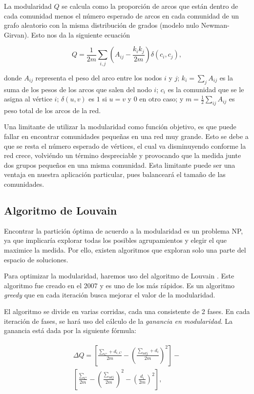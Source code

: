 \documentclass[conference]{IEEEtran}
\begin{document}
La modularidad $Q$ se calcula como la proporción de arcos que están dentro de cada comunidad menos el número esperado de arcos en cada comunidad de un grafo aleatorio con la misma distribución de grados (modelo nulo Newman-Girvan). Esto nos da la siguiente ecuación \cite{blondel_fast_2008}

\[
    Q = \frac{1}{2m} \sum_{i,j} (A_{ij} - \frac{k_i k_j}{2m}) \delta (c_i, c_j),
\]

donde $A_{ij}$ representa el peso del arco entre los nodos $i$ y $j$; $k_i = \sum_j A_{ij}$ es la suma de los pesos de los arcos que salen del nodo $i$; $c_i$ es la comunidad que se le asigna al vértice $i$; $\delta(u,v)$ es $1$ si $u=v$ y $0$ en otro caso; y $m = \frac{1}{2} \sum_{ij} A_{ij}$ es peso total de los arcos de la red.

Una limitante de utilizar la modularidad como función objetivo, es que puede fallar en encontrar comunidades pequeñas en una red muy grande. Esto se debe a que se resta el número esperado de vértices, el cual va disminuyendo conforme la red crece, volviéndo un término despreciable y provocando que la medida junte dos grupos pequeños en una misma comunidad. Esta limitante puede ser una ventaja en nuestra aplicación particular, pues balanceará el tamaño de las comunidades.

\subsection{Algoritmo de Louvain}

Encontrar la partición óptima de acuerdo a la modularidad es un problema NP, ya que implicaría explorar todas los posibles agrupamientos y elegir el que maximice la medida. Por ello, existen algoritmos que exploran solo una parte del espacio de soluciones. 

Para optimizar la modularidad, haremos uso del algoritmo de Louvain \cite{Blondel08fastunfolding}. Este algoritmo fue creado en el 2007 y es uno de los más rápidos. Es un algoritmo \textit{greedy} que en cada iteración busca mejorar el valor de la modularidad. 

El algoritmo se divide en varias corridas, cada una consistente de 2 fases. En cada iteración de fases, se hará uso del cálculo de la \textit{ganancia en modularidad}. La ganancia está dada por la siguiente fórmula:

\begin{align}
\begin{split}
    \Delta Q = \left[  \frac{ \sum_{C} +  d_{i,C} }{  2m  }  - \left( \frac{ \sum_{adj} +  d_{i} }{2m} \right)^2  \right] - \\
    \left[ \frac{ \sum_{C} }{2m}  -  \left( \frac{\sum_{adj} }{ 2m } \right)^2 - \left( \frac{ d_i }{ 2m } \right)^2 \right],
\end{split}
\end{align}
\end{document}
